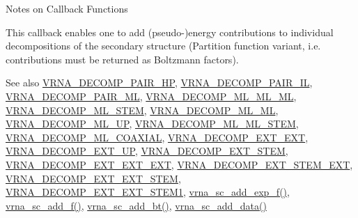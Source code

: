 \begin{DoxyRefDesc}{Notes on Callback Functions}
\item[\hyperlink{callbacks__callbacks000003}{Notes on Callback Functions}]This callback enables one to add (pseudo-\/)energy contributions to individual decompositions of the secondary structure (Partition function variant, i.\+e. contributions must be returned as Boltzmann factors). \end{DoxyRefDesc}


\begin{DoxySeeAlso}{See also}
\hyperlink{group__constraints_ga8bd41ebc8039378d242e4e8c273716a5}{V\+R\+N\+A\+\_\+\+D\+E\+C\+O\+M\+P\+\_\+\+P\+A\+I\+R\+\_\+\+HP}, \hyperlink{group__constraints_gaeab04f34d7730cff2d651d782f95d857}{V\+R\+N\+A\+\_\+\+D\+E\+C\+O\+M\+P\+\_\+\+P\+A\+I\+R\+\_\+\+IL}, \hyperlink{group__constraints_gaa15b1185673f0b9e900c4748d45f388f}{V\+R\+N\+A\+\_\+\+D\+E\+C\+O\+M\+P\+\_\+\+P\+A\+I\+R\+\_\+\+ML}, \hyperlink{group__constraints_ga735517266f2e35e1374b8f1ea77ef23e}{V\+R\+N\+A\+\_\+\+D\+E\+C\+O\+M\+P\+\_\+\+M\+L\+\_\+\+M\+L\+\_\+\+ML}, \hyperlink{group__constraints_ga4a23054c75d8efc785de50e3ea87602f}{V\+R\+N\+A\+\_\+\+D\+E\+C\+O\+M\+P\+\_\+\+M\+L\+\_\+\+S\+T\+EM}, \hyperlink{group__constraints_ga7f4cb9ff7a33e67f0539bd39e7b19a78}{V\+R\+N\+A\+\_\+\+D\+E\+C\+O\+M\+P\+\_\+\+M\+L\+\_\+\+ML}, \hyperlink{group__constraints_gae6478dda14e50e2f2cb9ef333a29256e}{V\+R\+N\+A\+\_\+\+D\+E\+C\+O\+M\+P\+\_\+\+M\+L\+\_\+\+UP}, \hyperlink{group__constraints_ga63d8ceb8c96ae3b463e529e28cc0fe98}{V\+R\+N\+A\+\_\+\+D\+E\+C\+O\+M\+P\+\_\+\+M\+L\+\_\+\+M\+L\+\_\+\+S\+T\+EM}, \hyperlink{group__constraints_ga4fe48d575830b16c208e280e01ab1497}{V\+R\+N\+A\+\_\+\+D\+E\+C\+O\+M\+P\+\_\+\+M\+L\+\_\+\+C\+O\+A\+X\+I\+AL}, \hyperlink{group__constraints_ga437adf5115c1999304eff26b41e4c9b6}{V\+R\+N\+A\+\_\+\+D\+E\+C\+O\+M\+P\+\_\+\+E\+X\+T\+\_\+\+E\+XT}, \hyperlink{group__constraints_gaff1ddaffe86d984623910b40cc8a8717}{V\+R\+N\+A\+\_\+\+D\+E\+C\+O\+M\+P\+\_\+\+E\+X\+T\+\_\+\+UP}, \hyperlink{group__constraints_gae44b5ace0d9b4a29088069ecb4cec441}{V\+R\+N\+A\+\_\+\+D\+E\+C\+O\+M\+P\+\_\+\+E\+X\+T\+\_\+\+S\+T\+EM}, \hyperlink{group__constraints_ga803bd818b3f4b2b0a4a5cfa2f7dc2045}{V\+R\+N\+A\+\_\+\+D\+E\+C\+O\+M\+P\+\_\+\+E\+X\+T\+\_\+\+E\+X\+T\+\_\+\+E\+XT}, \hyperlink{group__constraints_gabb09c5b78b75a44502fc77b950125c1e}{V\+R\+N\+A\+\_\+\+D\+E\+C\+O\+M\+P\+\_\+\+E\+X\+T\+\_\+\+S\+T\+E\+M\+\_\+\+E\+XT}, \hyperlink{group__constraints_ga06efd054c9271438f6d82d4559d9e69f}{V\+R\+N\+A\+\_\+\+D\+E\+C\+O\+M\+P\+\_\+\+E\+X\+T\+\_\+\+E\+X\+T\+\_\+\+S\+T\+EM}, \hyperlink{group__constraints_ga2e75d7a77118735b32f25422d9686719}{V\+R\+N\+A\+\_\+\+D\+E\+C\+O\+M\+P\+\_\+\+E\+X\+T\+\_\+\+E\+X\+T\+\_\+\+S\+T\+E\+M1}, \hyperlink{group__soft__constraints_ga87e382b5d0c9b7d9ce1b79c0473ff700}{vrna\+\_\+sc\+\_\+add\+\_\+exp\+\_\+f()}, \hyperlink{group__soft__constraints_ga8c7d907ec0125cd61c04e0908010a4e9}{vrna\+\_\+sc\+\_\+add\+\_\+f()}, \hyperlink{group__soft__constraints_gabde7d07a79bb9a8f4721aee247b674ea}{vrna\+\_\+sc\+\_\+add\+\_\+bt()}, \hyperlink{group__soft__constraints_ga15c6d52471ec97897e2bb7f964f5deb6}{vrna\+\_\+sc\+\_\+add\+\_\+data()}
\end{DoxySeeAlso}

